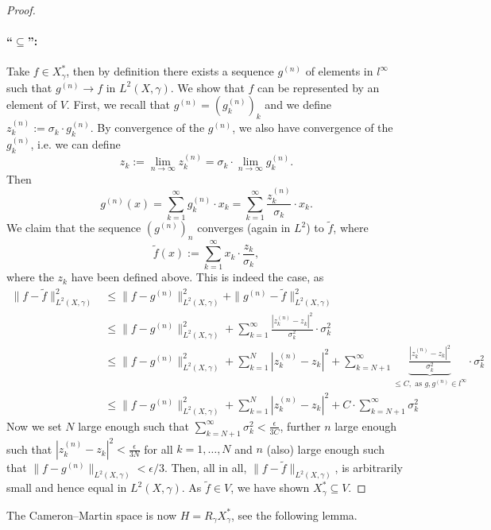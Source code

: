 \documentclass{scrartcl}
\theoremstyle{definition}
\theoremstyle{remark}
\begin{document}
{\begin{proof}
\paragraph{``$\subseteq$'':} Take $f\in X_\gamma^*$, then by definition there exists a sequence $g^{(n)}$ of elements in $l^\infty$ such that $g^{(n)} \to f$ in $L^2(X, \gamma)$. We show that $f$ can be represented by an element of $V$. First, we recall that $g^{(n)} = (g^{(n)}_k)_k$ and we define $z_k^{(n)} := \sigma_k \cdot g^{(n)}_k$. By convergence of the $g^{(n)}$, we also have convergence of the $g^{(n)}_k$, i.e. we can define
\[z_k := \lim_{n\to\infty} z_k^{(n)} = \sigma_k \cdot \lim_{n\to\infty}  g^{(n)}_k.\]
 Then 
\[g^{(n)}(x) = \sum_{k=1}^\infty g^{(n)}_k\cdot x_k = \sum_{k=1}^\infty \frac{z_k^{(n)}}{\sigma_k}\cdot x_k.\]
We claim that the sequence $(g^{(n)})_n$ converges (again in $L^2$) to $\tilde f$, where 
\[\tilde f(x) := \sum_{k=1}^\infty x_k\cdot \frac{z_k}{\sigma_k},\]
where the $z_k$ have been defined above. This is indeed the case, as
\begin{align*} \|f - \tilde f\|_{L^2(X,\gamma)}^2 &\leq \|f - g^{(n)}\|_{L^2(X,\gamma)}^2 + \|g^{(n)} - \tilde f\|_{L^2(X,\gamma)}^2 \\
&\leq \|f - g^{(n)}\|_{L^2(X,\gamma)}^2 + \sum_{k=1}^\infty \frac{|z_k^{(n)} - z_k|^2}{\sigma_k^2}\cdot \sigma_k^2 \\
&\leq \|f - g^{(n)}\|_{L^2(X,\gamma)}^2 + \sum_{k=1}^N |z_k^{(n)} - z_k|^2 + \sum_{k=N+1}^\infty \underbrace{\frac{|z_k^{(n)} - z_k|^2}{\sigma_k^2}}_{\leq C, \text{ as } g, g^{(n)}\in l^\infty}\cdot \sigma_k^2\\
&\leq \|f - g^{(n)}\|_{L^2(X,\gamma)}^2 + \sum_{k=1}^N |z_k^{(n)} - z_k|^2 + C\cdot  \sum_{k=N+1}^\infty \sigma_k^2 \end{align*}
Now we set $N$ large enough such that $\sum_{k=N+1}^\infty \sigma_k^2 < \frac{\epsilon}{3C}$, further $n$ large enough such that $|z_k^{(n)} - z_k|^2 < \frac{\epsilon}{3N}$ for all $k=1,\ldots,N$ and $n$ (also) large enough such that $\|f-g^{(n)}\|_{L^2(X,\gamma)} < \epsilon/3$. Then, all in all, $\|f-\tilde f\|_{L^2(X,\gamma)}$, is arbitrarily small and hence equal in $L^2(X,\gamma)$. As $\tilde f\in V$, we have shown $X_\gamma^*\subseteq V$.
\end{proof}
The Cameron--Martin space is now $H = R_\gamma X_\gamma^*$, see the following lemma.

}
\end{document}
